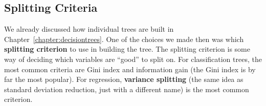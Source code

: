 \subsection{Splitting Criteria}

We already discussed how individual trees are built in Chapter~\ref{chapter:decisiontrees}. One of the choices we made then was which \textbf{splitting criterion} to use in building the tree. The splitting criterion is some way of deciding which variables are ``good'' to split on. For classification trees, the most common criteria are Gini index and information gain (the Gini index is by far the most popular). For regression, \textbf{variance splitting} (the same idea as standard deviation reduction, just with a different name) is the most common criterion.

\vspace{4mm}

